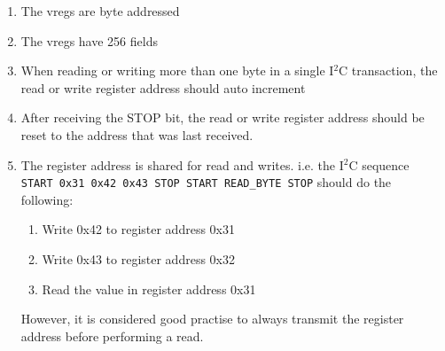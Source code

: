 \begin{enumerate}
\item The vregs are byte addressed
\item The vregs have 256 fields
\item When reading or writing more than one byte in a single I$^2$C transaction, the read or write register address should auto increment
\item After receiving the STOP bit, the read or write register address should be reset to the address that was last received.
\item The register address is shared for read and writes. i.e. the I$^2$C sequence \\
    \verb|START 0x31 0x42 0x43 STOP START READ_BYTE STOP| should do the following:
    \begin{enumerate}
        \item Write 0x42 to register address 0x31
        \item Write 0x43 to register address 0x32
        \item Read the value in register address 0x31
    \end{enumerate}
    However, it is considered good practise to always transmit the register address before performing a read.
\end{enumerate}